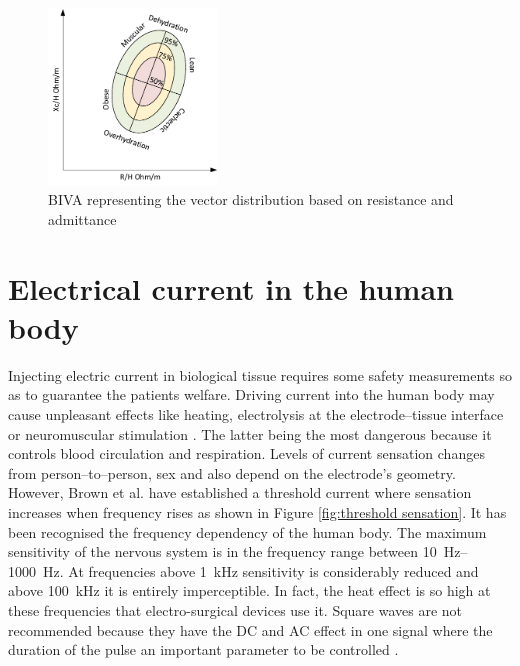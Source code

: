 \begin{figure}[!htpb]
	\centering
	\includegraphics[width=0.4\textwidth,keepaspectratio]{figure13}    
	\caption[BIVA representation]{BIVA representing the vector distribution based on resistance and admittance}
	\label{fig:BIVA plot}
\end{figure}


\section{Electrical current in the human body} %
\label{section impedance 7}
Injecting electric current in biological tissue requires some safety measurements so as to guarantee the patients welfare. Driving current into the human body may cause unpleasant effects like heating, electrolysis at the electrode–tissue interface or neuromuscular stimulation \cite{bertemes2002tissue, martinsen2011bioimpedance}. The latter being the most dangerous because it controls blood circulation and respiration. Levels of current sensation changes from person–to–person, sex and also depend on the electrode’s geometry. However, Brown et al. \cite{brown1998medical} have established a threshold current where sensation increases when frequency rises as shown in Figure \ref{fig:threshold sensation}.  It has been recognised the frequency dependency of the human body. The maximum sensitivity of the nervous system is in the frequency range between \SIrange[scientific-notation = engineering]{10}{1000}{\hertz}. At frequencies above \SI{1}{\kilo\hertz} sensitivity is considerably reduced and above \SI{100}{\kilo\hertz} it is entirely imperceptible. In fact, the heat effect is so high at these frequencies that electro-surgical devices use it. Square waves are not recommended because they have the DC and AC effect in one signal where the duration of the pulse an important parameter to be controlled \cite{martinsen2011bioimpedance}.

